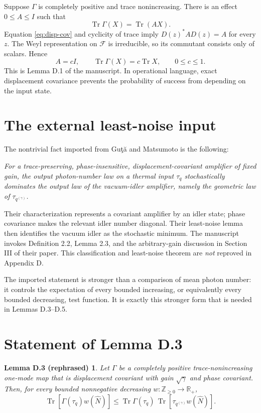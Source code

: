 \documentclass[11pt]{article}
\newcommand{\F}{\mathcal F}
\newcommand{\Tr}{\operatorname{Tr}}
\newcommand{\R}{\mathbb R}
\newtheorem*{lemmaD}{Lemma D.3 (rephrased)}
\begin{document}
Suppose $\Gamma$ is completely positive and trace nonincreasing.  There is
an effect $0\leq A\leq I$ such that
\begin{equation}\label{eq:effect}
  \Tr\Gamma(X)=\Tr(AX).
\end{equation}
Equation \eqref{eq:disp-cov} and cyclicity of trace imply
$D(z)^*AD(z)=A$ for every $z$.  The Weyl representation on $\F$ is
irreducible, so its commutant consists only of scalars.  Hence
\begin{equation}\label{eq:constant-trace}
  A=cI,
  \qquad
  \Tr\Gamma(X)=c\Tr X,
  \qquad 0\leq c\leq1.
\end{equation}
This is Lemma D.1 of the manuscript.  In operational language, exact
displacement covariance prevents the probability of success from depending
on the input state.

\section{The external least-noise input}

The nontrivial fact imported from Gu\c{t}\u{a} and Matsumoto is the
following:

\medskip
\noindent
\emph{For a trace-preserving, phase-insensitive,
displacement-covariant amplifier of fixed gain, the output photon-number law
on a thermal input $\tau_q$ stochastically dominates the output law of the
vacuum-idler amplifier, namely the geometric law of
$\tau_{q^{(\gamma)}}$.}
\medskip

Their characterization represents a covariant amplifier by an idler state;
phase covariance makes the relevant idler number diagonal.  Their
least-noise lemma then identifies the vacuum idler as the stochastic
minimum.  The manuscript invokes Definition 2.2, Lemma 2.3, and the
arbitrary-gain discussion in Section III of their paper.  This classification
and least-noise theorem are \emph{not} reproved in Appendix D.

The imported statement is stronger than a comparison of mean photon number:
it controls the expectation of every bounded increasing, or equivalently
every bounded decreasing, test function.  It is exactly this stronger form
that is needed in Lemmas D.3--D.5.

\section{Statement of Lemma D.3}

\begin{lemmaD}
Let $\Gamma$ be a completely positive trace-nonincreasing one-mode map that
is displacement covariant with gain $\sqrt\gamma$ and phase covariant.  Then,
for every bounded nonnegative decreasing
$w:\mathbb Z_{\geq0}\to\R_+$,
\begin{equation}\label{eq:D3}
  \Tr\!\left[\Gamma(\tau_q)w(\widehat N)\right]
  \leq
  \Tr\Gamma(\tau_q)\,
  \Tr\!\left[\tau_{q^{(\gamma)}}w(\widehat N)\right].
\end{equation}
\end{lemmaD}
\end{document}
